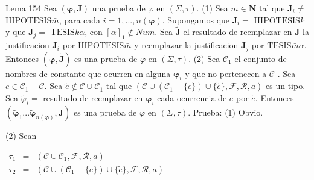 Lema 154 Sea \((\mathbf{\varphi },\mathbf{J})\) una prueba de \( \varphi \) en \((\Sigma ,\tau )\).
(1) Sea \(m\in \mathbf{N}\) tal que \(\mathbf{J}_{i}\neq \) \(\mathrm{ HIPOTESIS}\bar{m}\), para cada \(i=1,...,n(\mathbf{\varphi })\). Supongamos que \(\mathbf{J}_{i}=\) \(\mathrm{HIPOTESIS}\bar{k}\) y que \(\mathbf{J}_{j}=\) \( \mathrm{TESIS}\bar{k}\alpha \), con \([\alpha ]_{1}\notin Num\). Sea \(\mathbf{ \tilde{J}}\) el resultado de reemplazar en \(\mathbf{J}\) la justificacion \( \mathbf{J}_{i}\) por \(\mathrm{HIPOTESIS}\bar{m}\) y reemplazar la justificacion \(\mathbf{J}_{j}\) por \(\mathrm{TESIS}\bar{m}\alpha \). Entonces \( (\mathbf{\varphi },\mathbf{\tilde{J}})\) es una prueba de \(\varphi \) en \( (\Sigma ,\tau )\).
(2) Sea \(\mathcal{C}_{1}\) el conjunto de nombres de constante que ocurren en alguna \(\mathbf{\varphi }_{i}\) y que no pertenecen a \(\mathcal{C}\) . Sea \(e\in \mathcal{C}_{1}-\mathcal{C}\). Sea \(\tilde{e}\notin \mathcal{C} \cup \mathcal{C}_{1}\) tal que \((\mathcal{C}\cup (\mathcal{C}_{1}-\{e\})\cup \{\tilde{e}\},\mathcal{F},\mathcal{R},a)\) es un tipo. Sea \(\tilde{\varphi} _{i}=\) resultado de reemplazar en \(\mathbf{\varphi }_{i}\) cada ocurrencia de \(e\) por \(\tilde{e}.\) Entonces \((\mathbf{\tilde{\varphi}}_{1}...\mathbf{ \tilde{\varphi}}_{n(\mathbf{\varphi })},\mathbf{J})\) es una prueba de \( \varphi \) en \((\Sigma ,\tau )\).
Prueba: (1) Obvio.

(2) Sean

\(\displaystyle \begin{array}{rcl} \tau _{1} & =& (\mathcal{C}\cup \mathcal{C}_{1},\mathcal{F},\mathcal{R},a) \\ \tau _{2} & =& (\mathcal{C}\cup (\mathcal{C}_{1}-\{e\})\cup \{\tilde{e}\}, \mathcal{F},\mathcal{R},a) \end{array} \)

